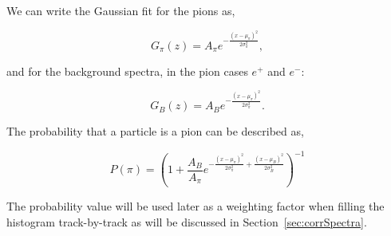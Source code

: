 We can write the Gaussian fit for the pions as, 

\begin{equation}
G_\pi(z) = A_\pi e^{-\frac{(x-\mu_\pi)^2}{2\sigma_\pi^2}},
\end{equation}

and for the background spectra, in the pion cases $e^+$ and $e^-$:

\begin{equation}
G_B(z) = A_B e^{-\frac{(x-\mu_\pi)^2}{2\sigma_\pi^2} }.
\end{equation}

The probability that a particle is a pion can be described as,

\begin{equation}
P(\pi) = \left( 1 + \frac{A_B}{A_\pi} e^{-\frac{(x-\mu_\pi)^2}{2\sigma_\pi^2}  + \frac{(x-\mu_B)^2}{2\sigma_B^2} } \right)^{-1}
\label{eq:pionProbs}
\end{equation}

The probability value will be used later as a weighting factor when filling the histogram track-by-track as will be discussed in Section~\ref{sec:corrSpectra}. 